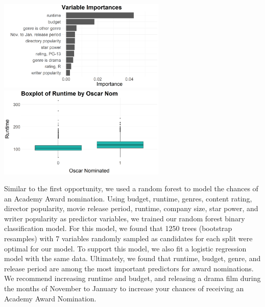 \documentclass[10pt]{article}
\begin{document}
\begin{center}
\includegraphics[width=8cm]{_assets/predictive_analysis/variable_importance_rf_osc_nom.png}
\hspace{1cm}
\includegraphics[width=8cm]{_assets/_eda/runtime_on.png}
\end{center}

\quad Similar to the first opportunity, we used a random forest to model the chances of an Academy Award nomination. Using budget, runtime, genres, content rating, director popularity, movie release period, runtime, company size, star power, and writer popularity as predictor variables, we trained our random forest binary classification model. For this model, we found that 1250 trees (bootstrap resamples) with 7 variables randomly sampled as candidates for each split were optimal for our model. To support this model, we also fit a logistic regression model with the same data. Ultimately, we found that runtime, budget, genre, and release period are among the most important predictors for award nominations. We recommend increasing runtime and budget, and releasing a drama film during the months of November to January to increase your chances of receiving an Academy Award Nomination.
\end{document}

